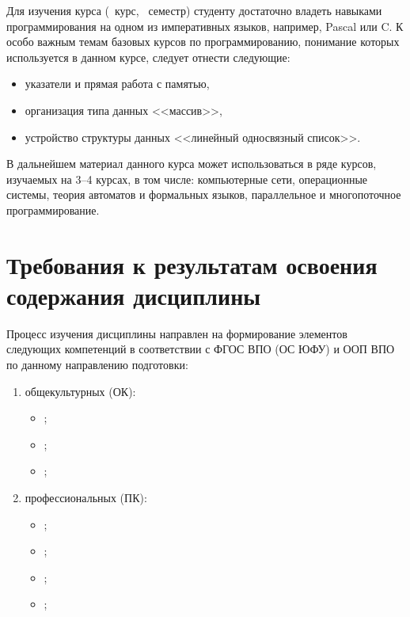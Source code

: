 	\ssect %
Для изучения курса \thecourse{} (\theyearofstudy~курс, \theterm~семестр)
студенту достаточно владеть навыками программирования на одном из императивных языков, например, Pascal или C. К особо важным темам базовых курсов по программированию, понимание которых используется в данном курсе, следует отнести следующие:
\begin{itemize}
	\item указатели и прямая работа с памятью,
	\item организация типа данных <<массив>>,
	\item устройство структуры данных <<линейный односвязный список>>.
\end{itemize}

	\ssect
В дальнейшем материал данного курса может использоваться в ряде курсов,
изучаемых на 3--4 курсах, в том числе: компьютерные сети, операционные системы, теория автоматов и формальных языков, параллельное и многопоточное
программирование.

\section{Требования к результатам освоения содержания дисциплины}

	\ssect
Процесс изучения дисциплины направлен на формирование элементов следующих компетенций в соответствии с ФГОС ВПО (ОС ЮФУ) и ООП ВПО по данному направлению подготовки:
\begin{enumerate}
\rusitems %
	\item общекультурных (ОК):
	\begin{itemize}
		\item ;
		\item ;
		\item ;
	\end{itemize}

	\item профессиональных (ПК):
	\begin{itemize}
		\item ;
		\item ;
		\item ;
		\item ;
	\end{itemize}
\end{enumerate}

